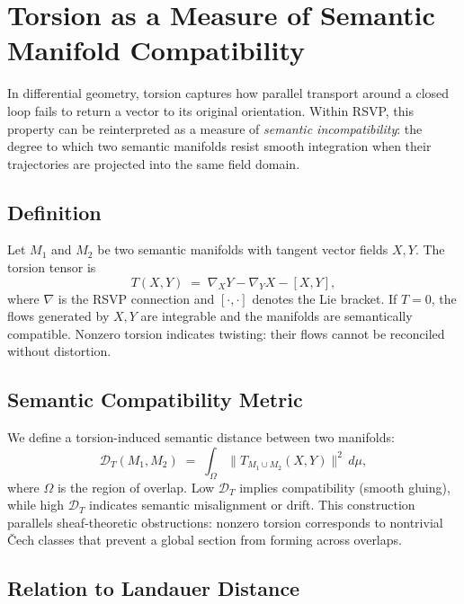 \documentclass[a4paper,11pt]{article}
\begin{document}
\section{Torsion as a Measure of Semantic Manifold Compatibility}

In differential geometry, torsion captures how parallel transport around a
closed loop fails to return a vector to its original orientation. Within RSVP,
this property can be reinterpreted as a measure of \emph{semantic
incompatibility}: the degree to which two semantic manifolds resist smooth
integration when their trajectories are projected into the same field domain.

\subsection{Definition}

Let $M_1$ and $M_2$ be two semantic manifolds with tangent vector fields
$X,Y$. The torsion tensor is
\begin{equation}
T(X,Y) \;=\; \nabla_X Y - \nabla_Y X - [X,Y],
\end{equation}
where $\nabla$ is the RSVP connection and $[\cdot,\cdot]$ denotes the Lie
bracket. If $T=0$, the flows generated by $X,Y$ are integrable and the
manifolds are semantically compatible. Nonzero torsion indicates twisting:
their flows cannot be reconciled without distortion.

\subsection{Semantic Compatibility Metric}

We define a torsion-induced semantic distance between two manifolds:
\begin{equation}
\mathcal{D}_T(M_1,M_2) \;=\; 
\int_{\Omega} \|T_{M_1 \cup M_2}(X,Y)\|^2 \, d\mu,
\end{equation}
where $\Omega$ is the region of overlap. Low $\mathcal{D}_T$ implies
compatibility (smooth gluing), while high $\mathcal{D}_T$ indicates semantic
misalignment or drift. This construction parallels sheaf-theoretic
obstructions: nonzero torsion corresponds to nontrivial Čech classes that
prevent a global section from forming across overlaps.

\subsection{Relation to Landauer Distance}
\end{document}
